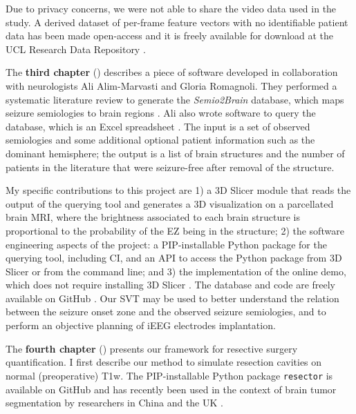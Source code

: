 Due to privacy concerns, we were not able to share the video data used in the study.
A derived dataset of per-frame feature vectors with no identifiable patient data has been made open-access and it is freely available for download at the UCL Research Data Repository \cite{perez-garcia_data_2021}.


The \textbf{third chapter} () describes a piece of software developed in collaboration with neurologists Ali Alim-Marvasti and Gloria Romagnoli.
They performed a systematic literature review to generate the \textit{Semio2Brain} database, which maps seizure semiologies to brain regions \cite{alim-marvasti_probabilistic_2021}.
Ali also wrote software to query the database, which is an Excel spreadsheet \cite{alim-marvasti_mapping_2021}.
The input is a set of observed semiologies and some additional optional patient information such as the dominant hemisphere;
the output is a list of brain structures and the number of patients in the literature that were seizure-free after removal of the structure.

My specific contributions to this project are 1) a 3D Slicer module \cite{fedorov_3d_2012} that reads the output of the querying tool and generates a 3D visualization on a parcellated brain \ac{MRI}, where the brightness associated to each brain structure is proportional to the probability of the \ac{EZ} being in the structure; 2) the software engineering aspects of the project: a \ac{PIP}-installable Python package for the querying tool, including \ac{CI}, and an \ac{API} to access the Python package from 3D Slicer or from the command line; and 3) the implementation of the online demo, which does not require installing 3D Slicer%
.
The database and code are freely available on GitHub%
\fnurl{\svtgithub}.
Our \ac{SVT} may be used to better understand the relation between the seizure onset zone and the observed seizure semiologies, and to perform an objective planning of \ac{iEEG} electrodes implantation.


The \textbf{fourth chapter} () presents our framework for resective surgery quantification.
I first describe our method to simulate resection cavities on normal (preoperative) \ac{T1w}.
The \ac{PIP}-installable Python package \texttt{resector} is available on GitHub%
and has recently been used in the context of brain tumor segmentation by researchers in China and the UK \cite{zhang_self-supervised_2021}.

